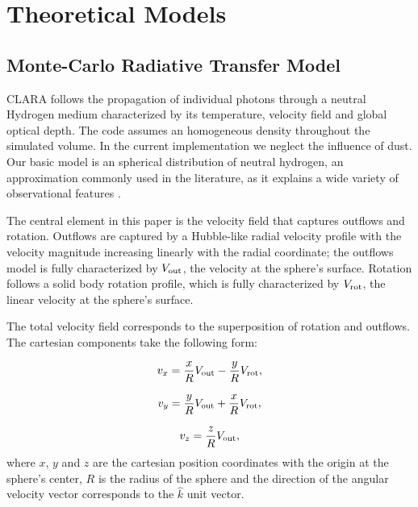 \documentclass[a4paper,fleqn,usenatbib]{mnras}
\begin{document}
\section{Theoretical Models}
\label{sec:theory}

\subsection{Monte-Carlo Radiative Transfer Model}

CLARA follows the propagation of individual photons through a neutral
Hydrogen medium characterized by its temperature, velocity field and
global optical depth.
The code assumes an homogeneous density throughout the simulated
volume.
In the current implementation we neglect the influence of dust.
Our basic model is an spherical distribution of neutral hydrogen,
an approximation commonly used in the literature, as it explains a
wide variety of observational features \citep{Ahn03,Verhamme06,Dijkstra06}.


The central element in this paper is the velocity field that captures
outflows and rotation.
Outflows are captured by a Hubble-like radial velocity profile with
the velocity magnitude increasing linearly with the radial
coordinate; the outflows model is fully characterized by $V_{\rm out}$, the
velocity at the sphere's surface.
Rotation follows a solid body rotation profile, which is fully
characterized by $V_{\rm rot}$, the linear velocity at the sphere's surface.

The total velocity field corresponds to the superposition of rotation and
outflows.
The cartesian components take the following form:

\begin{equation}
	v_{x}=\frac{x}{R}V_{\rm out}-\frac{y}{R}V_{\rm rot} ,
	\label{eq:vx}
\end{equation}

\begin{equation}
	v_{y}=\frac{y}{R}V_{\rm out}+\frac{x}{R}V_{\rm rot} ,
	\label{eq:vy}
\end{equation}

\begin{equation}
	v_{z}=\frac{z}{R}V_{\rm out},
	\label{eq:vz}
\end{equation}
%
where $x$, $y$ and $z$ are the cartesian position coordinates with the
origin at the sphere's center, $R$ is the radius of the sphere and the
direction of the angular velocity vector corresponds to the $\hat{k}$
unit vector.
\end{document}
